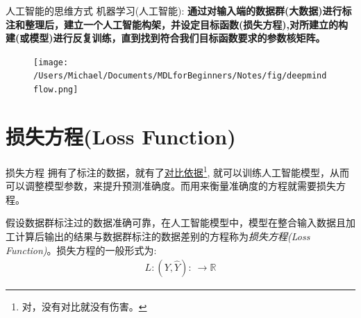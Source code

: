 \documentclass[handout]{beamer}
\newcommand{\rn}{\mathbb{R}}
\begin{document}
%

\begin{frame}{人工智能的思维方式}
机器学习(人工智能): \textbf{通过对输入端的数据群(大数据)进行标注和整理后，建立一个人工智能构架，并设定目标函数(损失方程),对所建立的构建(或模型)进行反复训练，直到找到符合我们目标函数要求的参数核矩阵。}
\begin{figure}[H]
	\centering
	\texttt{[image: /Users/Michael/Documents/MDLforBeginners/Notes/fig/deepmindflow.png]}
\end{figure}
\end{frame}




\section{损失方程(Loss Function)}

\begin{frame}{损失方程}
拥有了标注的数据，就有了\underline{对比依据}\footnote[frame]{对，没有对比就没有伤害。}, 就可以训练人工智能模型，从而可以调整模型参数，来提升预测准确度。而用来衡量准确度的方程就需要损失方程。

\hfil

\begin{definition}
	假设数据群标注过的数据准确可靠，在人工智能模型中，模型在整合输入数据且加工计算后输出的结果与数据群标注的数据差别的方程称为\textit{损失方程(Loss Function)}。损失方程的一般形式为:
\begin{align*}
	L: (Y, \hat{Y}): \ \to \rn 
\end{align*}	
\end{definition}
\end{frame}
\end{document}
